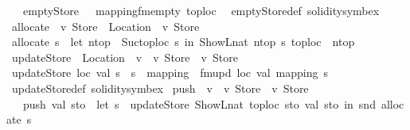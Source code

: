 \begin{isabellebody}
\ \ \ {\isachardoublequoteopen}emptyStore\ {\isacharequal}{\kern0pt}\ {\isasymlparr}\ mapping{\isacharequal}{\kern0pt}fmempty{\isacharcomma}{\kern0pt}\ toploc{\isacharequal}{\kern0pt}{}\ {\isasymrparr}{\isachardoublequoteclose}\isanewline
\isanewline
{}\isamarkupfalse%
\ emptyStore{\isacharunderscore}{\kern0pt}def\ {\isacharbrackleft}{\kern0pt}solidity{\isacharunderscore}{\kern0pt}symbex{\isacharbrackright}{\kern0pt}\isanewline
\isanewline
{}\isamarkupfalse%
\ allocate\ {\isacharcolon}{\kern0pt}{\isacharcolon}{\kern0pt}\ {\isachardoublequoteopen}{\isacharprime}{\kern0pt}v\ Store\ {\isasymRightarrow}\ Location\ {\isacharasterisk}{\kern0pt}\ {\isacharparenleft}{\kern0pt}{\isacharprime}{\kern0pt}v\ Store{\isacharparenright}{\kern0pt}{\isachardoublequoteclose}\isanewline
{}\ {\isachardoublequoteopen}allocate\ s\ {\isacharequal}{\kern0pt}\ {\isacharparenleft}{\kern0pt}let\ ntop\ {\isacharequal}{\kern0pt}\ Suc{\isacharparenleft}{\kern0pt}toploc\ s{\isacharparenright}{\kern0pt}\ in\ {\isacharparenleft}{\kern0pt}ShowL\isactrlsub n\isactrlsub a\isactrlsub t\ ntop{\isacharcomma}{\kern0pt}\ s\ {\isasymlparr}toploc\ {\isacharcolon}{\kern0pt}{\isacharequal}{\kern0pt}\ ntop{\isasymrparr}{\isacharparenright}{\kern0pt}{\isacharparenright}{\kern0pt}{\isachardoublequoteclose}\isanewline
\isanewline
\isanewline
\isanewline
{}\isamarkupfalse%
\ updateStore\ {\isacharcolon}{\kern0pt}{\isacharcolon}{\kern0pt}\ {\isachardoublequoteopen}Location\ {\isasymRightarrow}\ {\isacharprime}{\kern0pt}v\ {\isasymRightarrow}\ {\isacharprime}{\kern0pt}v\ Store\ {\isasymRightarrow}\ {\isacharprime}{\kern0pt}v\ Store{\isachardoublequoteclose}\isanewline
{}\ {\isachardoublequoteopen}updateStore\ loc\ val\ s\ {\isacharequal}{\kern0pt}\ s\ {\isasymlparr}\ mapping\ {\isacharcolon}{\kern0pt}{\isacharequal}{\kern0pt}\ fmupd\ loc\ val\ {\isacharparenleft}{\kern0pt}mapping\ s{\isacharparenright}{\kern0pt}{\isasymrparr}{\isachardoublequoteclose}\isanewline
\isanewline
{}\isamarkupfalse%
\ updateStore{\isacharunderscore}{\kern0pt}def\ {\isacharbrackleft}{\kern0pt}solidity{\isacharunderscore}{\kern0pt}symbex{\isacharbrackright}{\kern0pt}\isanewline
\isanewline
{}\isamarkupfalse%
\ push\ {\isacharcolon}{\kern0pt}{\isacharcolon}{\kern0pt}\ {\isachardoublequoteopen}{\isacharprime}{\kern0pt}v\ {\isasymRightarrow}\ {\isacharprime}{\kern0pt}v\ Store\ {\isasymRightarrow}\ {\isacharprime}{\kern0pt}v\ Store{\isachardoublequoteclose}\isanewline
\ \ \ {\isachardoublequoteopen}push\ val\ sto\ {\isacharequal}{\kern0pt}\ {\isacharparenleft}{\kern0pt}let\ s\ {\isacharequal}{\kern0pt}\ updateStore\ {\isacharparenleft}{\kern0pt}ShowL\isactrlsub n\isactrlsub a\isactrlsub t\ {\isacharparenleft}{\kern0pt}toploc\ sto{\isacharparenright}{\kern0pt}{\isacharparenright}{\kern0pt}\ val\ sto\ in\ snd\ {\isacharparenleft}{\kern0pt}allocate\ s{\isacharparenright}{\kern0pt}{\isacharparenright}{\kern0pt}{\isachardoublequoteclose}\isanewline

\end{isabellebody}
